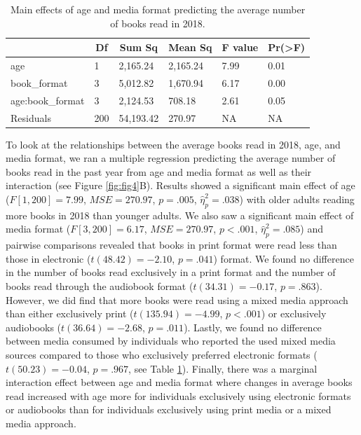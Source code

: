 \documentclass[man, fleqn, noextraspace]{apa6}
\theoremstyle{definition}
\theoremstyle{definition}
\theoremstyle{definition}
\theoremstyle{remark}
\begin{document}
\begin{table}[tbp]
\begin{center}
\begin{threeparttable}
\caption{\label{tab:tab2}Main effects of age and media format predicting the average number of books read in 2018.}
\begin{tabular}{llllll}
\toprule
 & \multicolumn{1}{c}{Df} & \multicolumn{1}{c}{Sum Sq} & \multicolumn{1}{c}{Mean Sq} & \multicolumn{1}{c}{F value} & \multicolumn{1}{c}{Pr(>F)}\\
\midrule
age & 1 & 2,165.24 & 2,165.24 & 7.99 & 0.01\\
book\_format & 3 & 5,012.82 & 1,670.94 & 6.17 & 0.00\\
age:book\_format & 3 & 2,124.53 & 708.18 & 2.61 & 0.05\\
Residuals & 200 & 54,193.42 & 270.97 & NA & NA\\
\bottomrule
\end{tabular}
\end{threeparttable}
\end{center}
\end{table}

To look at the relationships between the average books read in 2018,
age, and media format, we ran a multiple regression predicting the
average number of books read in the past year from age and media format
as well as their interaction (see Figure \ref{fig:fig4}B). Results
showed a significant main effect of age (\(F[1, 200] = 7.99\),
\(\mathit{MSE} = 270.97\), \(p = .005\), \(\hat{\eta}^2_p = .038\)) with
older adults reading more books in 2018 than younger adults. We also saw
a significant main effect of media format (\(F[3, 200] = 6.17\),
\(\mathit{MSE} = 270.97\), \(p < .001\), \(\hat{\eta}^2_p = .085\)) and
pairwise comparisons revealed that books in print format were read less
than those in electronic (\(t(48.42) = -2.10\), \(p = .041\)) format. We
found no difference in the number of books read exclusively in a print
format and the number of books read through the audiobook format
(\(t(34.31) = -0.17\), \(p = .863\)). However, we did find that more
books were read using a mixed media approach than either exclusively
print (\(t(135.94) = -4.99\), \(p < .001\)) or exclusively audiobooks
(\(t(36.64) = -2.68\), \(p = .011\)). Lastly, we found no difference
between media consumed by individuals who reported the used mixed media
sources compared to those who exclusively preferred electronic formats
(\(t(50.23) = -0.04\), \(p = .967\), see Table \ref{tab:tab2}). Finally,
there was a marginal interaction effect between age and media format
where changes in average books read increased with age more for
individuals exclusively using electronic formats or audiobooks than for
individuals exclusively using print media or a mixed media approach.
\end{document}
